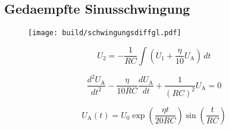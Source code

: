 \subsection{Gedaempfte Sinusschwingung}%
\label{sub:gedaempfte_sinusschwingung}

\begin{figure}[h]
		\centering
		\texttt{[image: build/schwingungsdiffgl.pdf]}
		\caption{}
		\label{fig:}
\end{figure}

\begin{equation}
		\label{eq:ov2}
		U_2 = - \frac{1}{RC} \int \left( U_1 + \frac{\eta}{10} U_\text{A} \right) \, dt
\end{equation}

\begin{equation}
		\label{eq:schwingung_diff}
		\frac{d^2 U_\text{A}}{dt^2} - \frac{\eta}{10 R C} \frac{d
		U_\text{A}}{dt} + \frac{1}{(RC)^2} U_\text{A} = 0
\end{equation}


\begin{equation}
		U_\text{A}(t) = U_0 \exp \left( \frac{\eta t}{20 RC} \right) 
		\sin \left(\frac{t}{RC}\right)
\end{equation}
